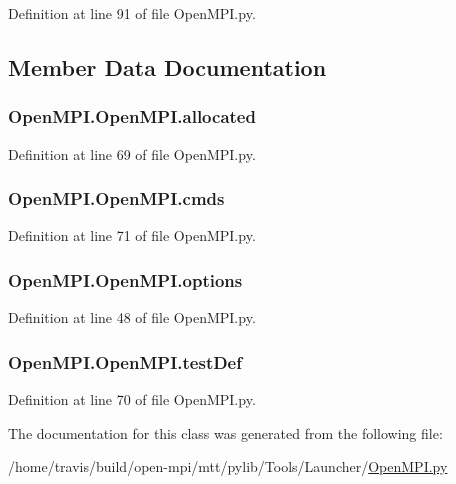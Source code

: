 Definition at line 91 of file Open\-M\-P\-I.\-py.



\subsection{Member Data Documentation}
\hypertarget{classOpenMPI_1_1OpenMPI_a9ffab4795264fde34d136269026204db}{
\subsubsection[{allocated}]{\setlength{\rightskip}{0pt plus 5cm}Open\-M\-P\-I.\-Open\-M\-P\-I.\-allocated}}\label{classOpenMPI_1_1OpenMPI_a9ffab4795264fde34d136269026204db}


Definition at line 69 of file Open\-M\-P\-I.\-py.

\hypertarget{classOpenMPI_1_1OpenMPI_a86be93bbc775c81263813274a8564efc}{
\subsubsection[{cmds}]{\setlength{\rightskip}{0pt plus 5cm}Open\-M\-P\-I.\-Open\-M\-P\-I.\-cmds}}\label{classOpenMPI_1_1OpenMPI_a86be93bbc775c81263813274a8564efc}


Definition at line 71 of file Open\-M\-P\-I.\-py.

\hypertarget{classOpenMPI_1_1OpenMPI_a4a263774614f0b83a63a26639b46b2f5}{
\subsubsection[{options}]{\setlength{\rightskip}{0pt plus 5cm}Open\-M\-P\-I.\-Open\-M\-P\-I.\-options}}\label{classOpenMPI_1_1OpenMPI_a4a263774614f0b83a63a26639b46b2f5}


Definition at line 48 of file Open\-M\-P\-I.\-py.

\hypertarget{classOpenMPI_1_1OpenMPI_acd20b78013350c2363484589ef85b67c}{
\subsubsection[{test\-Def}]{\setlength{\rightskip}{0pt plus 5cm}Open\-M\-P\-I.\-Open\-M\-P\-I.\-test\-Def}}\label{classOpenMPI_1_1OpenMPI_acd20b78013350c2363484589ef85b67c}


Definition at line 70 of file Open\-M\-P\-I.\-py.



The documentation for this class was generated from the following file\-:\begin{DoxyCompactItemize}
\item 
/home/travis/build/open-\/mpi/mtt/pylib/\-Tools/\-Launcher/\hyperlink{OpenMPI_8py}{Open\-M\-P\-I.\-py}\end{DoxyCompactItemize}
